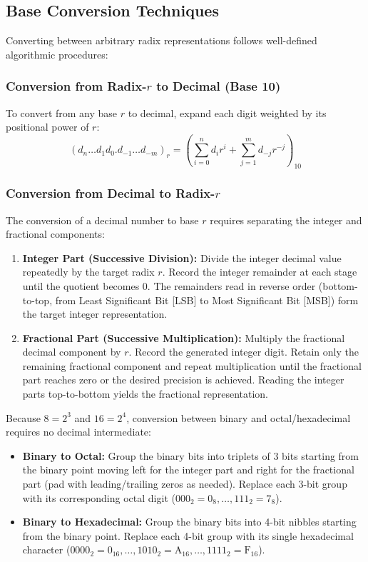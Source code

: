 \subsection{Base Conversion Techniques}
Converting between arbitrary radix representations follows well-defined algorithmic procedures:

\subsubsection{Conversion from Radix-$r$ to Decimal (Base 10)}
To convert from any base $r$ to decimal, expand each digit weighted by its positional power of $r$:
\begin{equation}
(d_n \dots d_1 d_0 . d_{-1} \dots d_{-m})_r = \left( \sum_{i=0}^n d_i r^i + \sum_{j=1}^m d_{-j} r^{-j} \right)_{10}
\end{equation}

\subsubsection{Conversion from Decimal to Radix-$r$}
The conversion of a decimal number to base $r$ requires separating the integer and fractional components:
\begin{enumerate}
    \item \textbf{Integer Part (Successive Division):} Divide the integer decimal value repeatedly by the target radix $r$. Record the integer remainder at each stage until the quotient becomes 0. The remainders read in reverse order (bottom-to-top, from Least Significant Bit [LSB] to Most Significant Bit [MSB]) form the target integer representation.
    \item \textbf{Fractional Part (Successive Multiplication):} Multiply the fractional decimal component by $r$. Record the generated integer digit. Retain only the remaining fractional component and repeat multiplication until the fractional part reaches zero or the desired precision is achieved. Reading the integer parts top-to-bottom yields the fractional representation.
\end{enumerate}

\begin{derivationbox}
Because $8 = 2^3$ and $16 = 2^4$, conversion between binary and octal/hexadecimal requires no decimal intermediate:
\begin{itemize}
    \item \textbf{Binary to Octal:} Group the binary bits into triplets of 3 bits starting from the binary point moving left for the integer part and right for the fractional part (pad with leading/trailing zeros as needed). Replace each 3-bit group with its corresponding octal digit ($000_2 = 0_8, \dots, 111_2 = 7_8$).
    \item \textbf{Binary to Hexadecimal:} Group the binary bits into 4-bit nibbles starting from the binary point. Replace each 4-bit group with its single hexadecimal character ($0000_2 = 0_{16}, \dots, 1010_2 = \text{A}_{16}, \dots, 1111_2 = \text{F}_{16}$).
\end{itemize}
\end{derivationbox}

